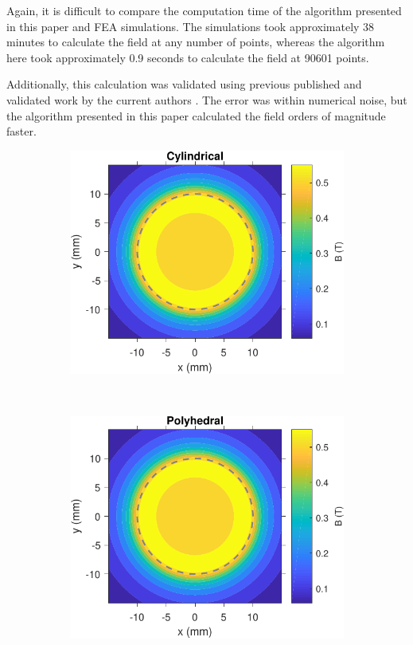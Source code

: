 Again, it is difficult to compare the computation time of the algorithm presented in this paper and FEA simulations. The simulations took approximately 38 minutes to calculate the field at any number of points, whereas the algorithm here took approximately 0.9 seconds to calculate the field at 90601 points.

Additionally, this calculation was validated using previous published and validated work by the current authors \cite{OConnell2020}. The error was within numerical noise, but the algorithm presented in this paper calculated the field orders of magnitude faster.
\begin{figure}
	\centering
	\begin{subfigure}{0.47\textwidth}
		\centering
		\includegraphics[width=\textwidth]{p2/p2FIG7a}
		\caption{}\label{fig:p2cylinderfielda}
	\end{subfigure}
	~
	\begin{subfigure}{0.47\textwidth}
		\centering
		\includegraphics[width=\textwidth]{p2/p2FIG7b}
		\caption{}\label{fig:p2cylinderfieldb}
	\end{subfigure}
	

\end{figure}
